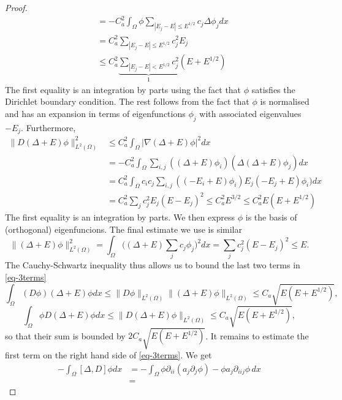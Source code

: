 \documentclass{article}
\begin{document}
\begin{proof}
\begin{align*}
& = -C_a^2 \int_{\Omega} \phi \sum_{|E_j - E| \le E^{1/2}} c_j \Delta \phi_j dx
\\
& = C_a^2 \sum_{|E_j - E| \le E^{1/2}} c_j^2 E_j \\
& \le C_a^2 \underbrace{\sum_{|E_j - E| < E^{1/2}} c_j^2}_1 (E + E^{1/2})
\end{align*}
The first equality is an integration by parts using the fact that $\phi$ satisfies the Dirichlet boundary condition.
The rest follows from the fact that $\phi$ is normalised and has an expansion in terms of eigenfunctions $\phi_j$ with associated eigenvalues $-E_j$.
Furthermore,
\begin{align*}
\lVert D(\Delta + E)\phi\rVert_{L^2(\Omega)}^2 & \le C_a^2 \int_{\Omega} \lvert \nabla (\Delta + E) \phi\rvert^2 dx \\
& = -C_a^2 \int_{\Omega} \sum_{i,j} ((\Delta + E) \phi_i) (\Delta (\Delta + E) \phi_j) dx \\
& = C_a^2 \int_{\Omega} c_i c_j \sum_{i,j} ((-E_i + E) \phi_i) E_j (-E_j + E) \phi_i) dx \\
& = C_a^2 \sum_j c_j^2 E_j (E-E_j)^2
\le C_a^2 E^{3/2}
\le C_a^2 E (E + E^{1/2})
\end{align*}
The first equality is an integration by parts. We then express $\phi$ is the basis of (orthogonal) eigenfuncions.
The final estimate we use is similar
\[
\lVert (\Delta + E) \phi \rVert_{L^2(\Omega)}^2
= \int_{\Omega} \Big((\Delta + E)\sum_j c_j \phi_j\Big)^2 dx
= \sum_j c_j^2 (E-E_j)^2 \le E.
\]
The Cauchy-Schwartz inequality thus allows us to bound the last two terms in \eqref{eq-3terms}
\[
\int_{\Omega} (D \phi) (\Delta + E)\phi dx \le \lVert D\phi \rVert_{L^2(\Omega)} \lVert (\Delta + E) \phi \rVert_{L^2(\Omega)}
\le C_a \sqrt{E(E + E^{1/2})},
\]
\[
\int_{\Omega} \phi D(\Delta + E) \phi dx \le \lVert D(\Delta + E) \phi \rVert_{L^2(\Omega)} \le C_a \sqrt{E (E + E^{1/2})},
\]
so that their sum is bounded by $2 C_a \sqrt{E (E+E^{1/2})}$.
It remains to estimate the first term on the right hand side of \eqref{eq-3terms}.
We get
\begin{align*}
- \int_{\Omega} [\Delta, D] \phi dx
& = -\int_{\Omega} \phi \partial_{ii} (a_j \partial_j \phi) - \phi a_j \partial_{iij} \phi \, dx \\
& = %
\end{align*}
\end{proof}
\end{document}
